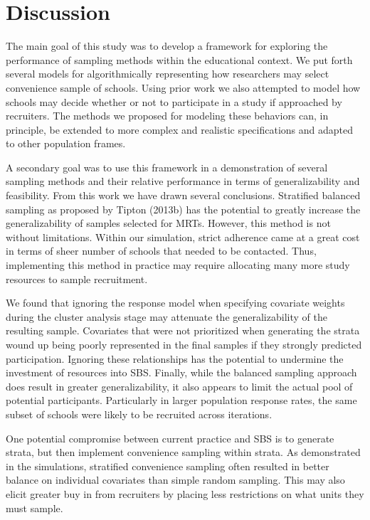 \documentclass[man,floatsintext]{apa6}
\begin{document}
\hypertarget{discussion}{%
\section{Discussion}\label{discussion}}

The main goal of this study was to develop a framework for exploring the performance of sampling methods within the educational context. We put forth several models for algorithmically representing how researchers may select convenience sample of schools. Using prior work we also attempted to model how schools may decide whether or not to participate in a study if approached by recruiters. The methods we proposed for modeling these behaviors can, in principle, be extended to more complex and realistic specifications and adapted to other population frames.

A secondary goal was to use this framework in a demonstration of several sampling methods and their relative performance in terms of generalizability and feasibility. From this work we have drawn several conclusions. Stratified balanced sampling as proposed by Tipton (2013b) has the potential to greatly increase the generalizability of samples selected for MRTs. However, this method is not without limitations. Within our simulation, strict adherence came at a great cost in terms of sheer number of schools that needed to be contacted. Thus, implementing this method in practice may require allocating many more study resources to sample recruitment.

We found that ignoring the response model when specifying covariate weights during the cluster analysis stage may attenuate the generalizability of the resulting sample. Covariates that were not prioritized when generating the strata wound up being poorly represented in the final samples if they strongly predicted participation. Ignoring these relationships has the potential to undermine the investment of resources into SBS. Finally, while the balanced sampling approach does result in greater generalizability, it also appears to limit the actual pool of potential participants. Particularly in larger population response rates, the same subset of schools were likely to be recruited across iterations.

One potential compromise between current practice and SBS is to generate strata, but then implement convenience sampling within strata. As demonstrated in the simulations, stratified convenience sampling often resulted in better balance on individual covariates than simple random sampling. This may also elicit greater buy in from recruiters by placing less restrictions on what units they must sample.
\end{document}
